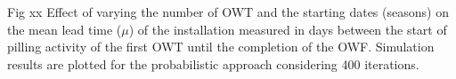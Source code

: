 \label{fig:Seasonaleffect}
Fig xx Effect of varying the number of OWT and the starting dates (seasons) on the mean lead time ($\mu$) of the installation measured in days between the start of pilling activity of the first OWT until the completion of the OWF. Simulation results are plotted for the probabilistic approach considering 400 iterations.
